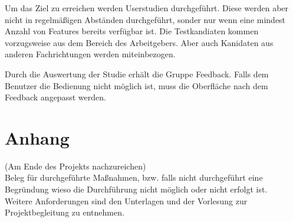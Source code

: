 \documentclass[accentcolor=tud9c,12pt,paper=a4]{tudreport}
\begin{document}
			Um das Ziel zu erreichen werden Userstudien durchgeführt.
			Diese werden aber nicht in regelmäßigen Abständen durchgeführt,
			sonder nur wenn eine mindest Anzahl von Features bereits
			verfügbar ist. Die Testkandiaten kommen vorzugsweise aus dem
			Bereich des Arbeitgebers. Aber auch Kanidaten aus anderen
			Fachrichtungen werden miteinbezogen.

			Durch die Auswertung der Studie erhält die Gruppe Feedback.
			Falls dem Benutzer die Bedienung nicht möglich ist, muss die
			Oberfläche nach dem Feedback angepasst werden.

\appendix
	\chapter{Anhang}
		(Am Ende des Projekts nachzureichen)\\
		Beleg für durchgeführte Maßnahmen, bzw. falls nicht durchgeführt eine Begründung wieso die Durchführung nicht möglich oder nicht erfolgt ist. \\
		Weitere Anforderungen sind den Unterlagen und der Vorlesung zur Projektbegleitung zu entnehmen.
\end{document}
